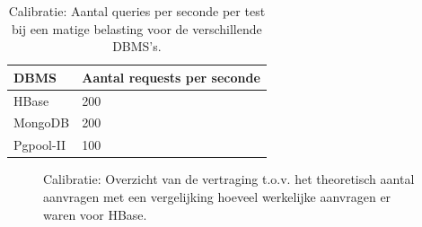 \begin{table}[h!]
	\centering
	\begin{tabular}{l| l }
		\textbf{DBMS} & Aantal requests per seconde \\
		\hline
		HBase & 200 \\
		MongoDB & 200\\
		Pgpool-II & 100\\
	\end{tabular}
	\caption{Calibratie: Aantal queries per seconde per test bij een matige belasting voor de verschillende DBMS's.}
	\label{table:calibratie-queriesperseconde-resultaat}
\end{table}

\begin{figure}[h!] 
	\centering
	\caption{Calibratie: Overzicht van de vertraging t.o.v. het theoretisch aantal aanvragen met een vergelijking hoeveel werkelijke aanvragen er waren voor HBase. }
	\label{fig:calibratie-queriesperseconde-hbase}
\end{figure}

